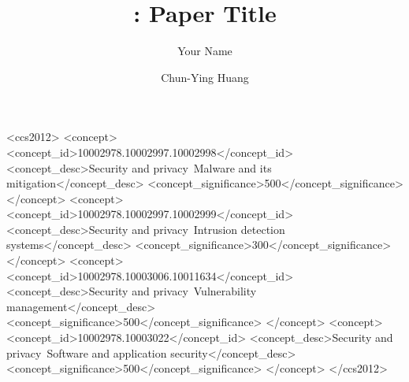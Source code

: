 \documentclass[sigconf,balance=false]{acmart}
\begin{document}
\title{\sys: Paper Title}

\author{Your Name}
\authornotemark[1]

\author{Chun-Ying Huang}
\authornotemark[1]

\begin{CCSXML}
<ccs2012>
<concept>
<concept_id>10002978.10002997.10002998</concept_id>
<concept_desc>Security and privacy~Malware and its mitigation</concept_desc>
<concept_significance>500</concept_significance>
</concept>
<concept>
<concept_id>10002978.10002997.10002999</concept_id>
<concept_desc>Security and privacy~Intrusion detection systems</concept_desc>
<concept_significance>300</concept_significance>
</concept>
<concept>
<concept_id>10002978.10003006.10011634</concept_id>
<concept_desc>Security and privacy~Vulnerability management</concept_desc>
<concept_significance>500</concept_significance>
</concept>
<concept>
<concept_id>10002978.10003022</concept_id>
<concept_desc>Security and privacy~Software and application security</concept_desc>
<concept_significance>500</concept_significance>
</concept>
</ccs2012>
\end{CCSXML}


\begin{abstract}

\end{abstract}


\maketitle






\appendix


\end{document}
